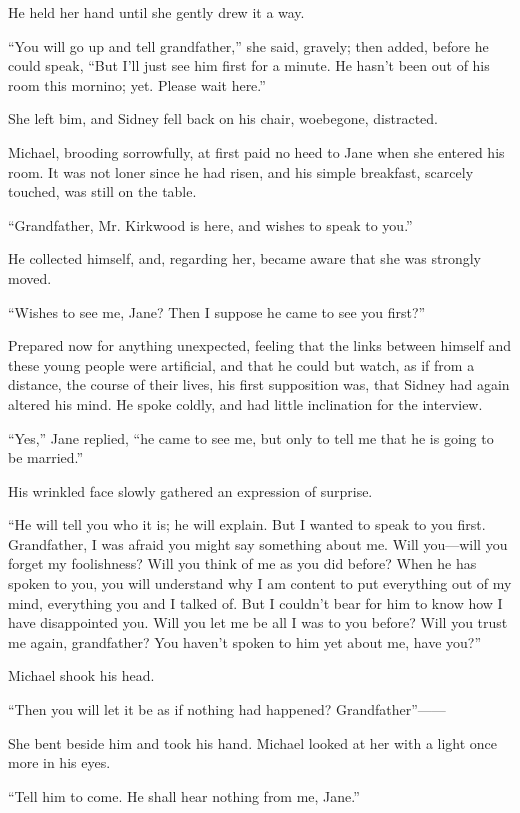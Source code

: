 He held her hand until she gently drew it a way.

``You will go up and tell grandfather,'' she said, gravely; then added,
before he could speak, ``But I'll just see him first for a minute. He
hasn't been out of his room this mornino; yet. Please wait here.''

{}She left bim, and Sidney fell back on his chair, woebegone,
distracted.

Michael, brooding sorrowfully, at first paid no heed to Jane when she
entered his room. It was not loner since he had risen, and his simple
breakfast, scarcely touched, was still on the table.

``Grandfather, Mr. Kirkwood is here, and wishes to speak to you.''

He collected himself, and, regarding her, became aware that she was
strongly moved.

``Wishes to see me, Jane? Then I suppose he came to see you first?''

Prepared now for anything unexpected, feeling that the links between
himself and these young people were artificial, and that he could but
watch, as if from a distance, the course of their lives, his first
supposition was, that Sidney had again altered his mind. He spoke
coldly, and had little inclination for the interview.

``Yes,'' Jane replied, ``he came to see me, but only to tell me that he
is going to be married.''

His wrinkled face slowly gathered an expression of surprise.

``He will tell you who it is; he will explain. {}But I wanted to speak
to you first. Grandfather, I was afraid you might say something about
me. Will you---will you forget my foolishness? Will you think of me as
you did before? When he has spoken to you, you will understand why I am
content to put everything out of my mind, everything you and I talked
of. But I couldn't bear for him to know how I have disappointed you.
Will you let me be all I was to you before? Will you trust me again,
grandfather? You haven't spoken to him yet about me, have you?''

Michael shook his head.

``Then you will let it be as if nothing had happened?
Grandfather''{{------}}

She bent beside him and took his hand. Michael looked at her with a
light once more in his eyes.

``Tell him to come. He shall hear nothing from me, Jane.''

